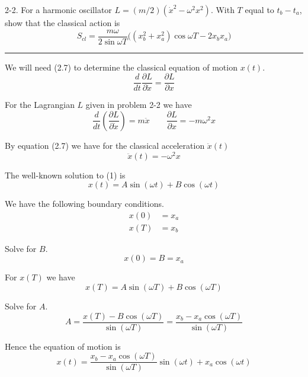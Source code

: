 \documentclass[12pt]{article}
\begin{document}
2-2.
For a harmonic oscillator $L=(m/2)(\dot x^2-\omega^2x^2)$.
With $T$ equal to $t_b-t_a$, show that the classical action is
\begin{equation*}
S_{cl}=\frac{m\omega}{2\sin\omega T}
\big((x_b^2+x_a^2)\cos\omega T-2x_bx_a\big)
\tag{2.9}
\end{equation*}

\bigskip
\hrule

\bigskip
We will need (2.7) to determine the classical equation of motion $x(t)$.
\begin{equation*}
\frac{d}{dt}\frac{\partial L}{\partial\dot x}=\frac{\partial L}{\partial x}
\tag{2.7}
\end{equation*}

For the Lagrangian $L$ given in problem 2-2 we have
\begin{equation*}
\frac{d}{dt}\left(\frac{\partial L}{\partial\dot x}\right)=m\ddot x
\qquad
\frac{\partial L}{\partial x}=-m\omega^2x
\end{equation*}

By equation (2.7) we have for the classical acceleration $\ddot x(t)$
\begin{equation*}
\ddot x(t)=-\omega^2x
\tag{1}
\end{equation*}

The well-known solution to (1) is
\begin{equation*}
x(t)=A\sin(\omega t)+B\cos(\omega t)
\end{equation*}

We have the following boundary conditions.
\begin{align*}
x(0)&=x_a
\\[1ex]
x(T)&=x_b
\end{align*}

Solve for $B$.
\begin{equation*}
x(0)=B=x_a
\end{equation*}

For $x(T)$ we have
\begin{equation*}
x(T)=A\sin(\omega T)+B\cos(\omega T)
\end{equation*}

Solve for $A$.
\begin{equation*}
A=\frac{x(T)-B\cos(\omega T)}{\sin(\omega T)}=
\frac{x_b-x_a\cos(\omega T)}{\sin(\omega T)}
\end{equation*}

Hence the equation of motion is
\begin{equation*}
x(t)=\frac{x_b-x_a\cos(\omega T)}{\sin(\omega T)}\sin(\omega t)+x_a\cos(\omega t)
\tag{2}
\end{equation*}
\end{document}
